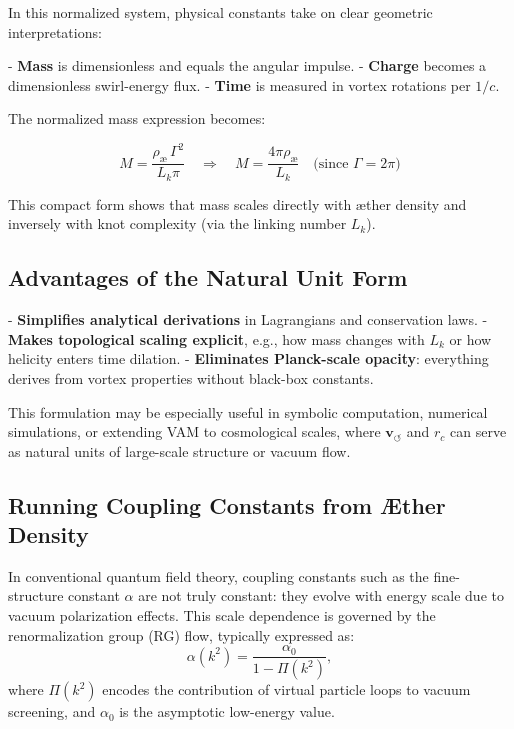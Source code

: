 \noindent In this normalized system, physical constants take on clear geometric interpretations:

- \textbf{Mass} is dimensionless and equals the angular impulse.
- \textbf{Charge} becomes a dimensionless swirl-energy flux.
- \textbf{Time} is measured in vortex rotations per \( 1/c \).

The normalized mass expression becomes:

\[
M = \frac{\rho_\text{\ae} \, \Gamma^2}{L_k \pi}
\quad \Rightarrow \quad
M = \frac{4\pi \rho_\text{\ae}}{L_k}
\quad \text{(since } \Gamma = 2\pi)
\]

This compact form shows that mass scales directly with æther density and inversely with knot complexity (via the linking number \( L_k \)).

\subsection*{Advantages of the Natural Unit Form}

- \textbf{Simplifies analytical derivations} in Lagrangians and conservation laws.
- \textbf{Makes topological scaling explicit}, e.g., how mass changes with \( L_k \) or how helicity enters time dilation.
- \textbf{Eliminates Planck-scale opacity}: everything derives from vortex properties without black-box constants.

This formulation may be especially useful in symbolic computation, numerical simulations, or extending VAM to cosmological scales, where \( \mathbf{v}_{\scriptscriptstyle\boldsymbol{\circlearrowleft}} \) and \( r_c \) can serve as natural units of large-scale structure or vacuum flow.
\subsection{Running Coupling Constants from Æther Density}

In conventional quantum field theory, coupling constants such as the fine-structure constant \( \alpha \) are not truly constant: they evolve with energy scale due to vacuum polarization effects. This scale dependence is governed by the renormalization group (RG) flow, typically expressed as:
\begin{equation}
\alpha(k^2) = \frac{\alpha_0}{1 - \Pi(k^2)},
\end{equation}
where \( \Pi(k^2) \) encodes the contribution of virtual particle loops to vacuum screening, and \( \alpha_0 \) is the asymptotic low-energy value.

